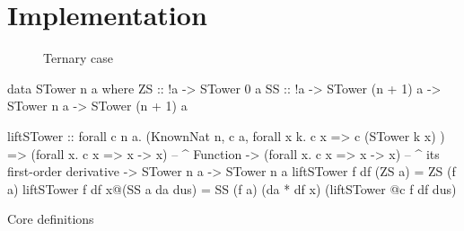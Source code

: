 \documentclass[rims-smooth-paper.tex]{subfiles}
\begin{document}
\section{Implementation}
\label{sec:impl}

\begin{figure}[htbp]
  \centering
  \caption{Ternary case\label{fig:tree}}
\end{figure}

\begin{listing}[tbp]
\begin{code}
data STower n a where
  ZS :: !a -> STower 0 a
  SS :: !a -> STower (n + 1) a -> STower n a -> STower (n + 1) a

liftSTower
  :: forall c n a. (KnownNat n, c a, forall x k. c x => c (STower k x) )
  => (forall x. c x => x -> x)
      -- ^ Function
  -> (forall x. c x => x -> x)
      -- ^ its first-order derivative
  -> STower n a
  -> STower n a
liftSTower f df (ZS a) = ZS (f a)
liftSTower f df x@(SS a da dus)
  = SS (f a) (da * df x) 
       (liftSTower @c f df dus)
\end{code}
\caption{Core definitions\label{lst:data-def}}
\end{listing}
\end{document}
